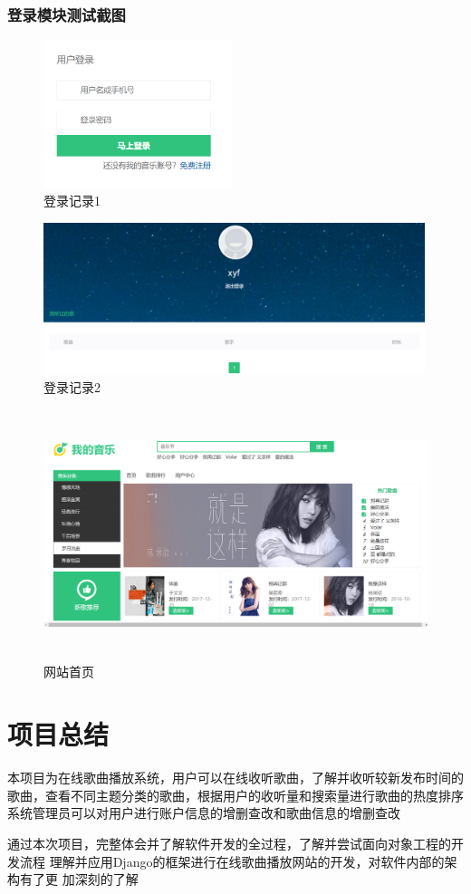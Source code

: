\documentclass[UTF8,14pt]{article}
\numberwithin{figure}{subsubsection}
\numberwithin{table}{subsubsection}
\begin{document}
\subsubsection{登录模块测试截图}
\begin{minipage}[t]{0.33\linewidth}
	\begin{figure}[H]
		\includegraphics[width=5.51cm,height=4.33cm]{login1.png}
		\caption{登录记录1}
	\end{figure}
\end{minipage}
\hfill
\begin{minipage}[t]{0.66\linewidth}
	\begin{figure}[H]
		\centering
		\includegraphics[width=11.142cm,height=4.428cm]{login2.png}
		\caption{登录记录2}
	\end{figure}
\end{minipage}
\begin{figure}[H]
	\centering
	\includegraphics[width=15.096cm,height=7.31cm]{final.png}
	\caption{网站首页}
\end{figure}
\section{项目总结}
本项目为在线歌曲播放系统，用户可以在线收听歌曲，了解并收听较新发布时间的
歌曲，查看不同主题分类的歌曲，根据用户的收听量和搜索量进行歌曲的热度排序
系统管理员可以对用户进行账户信息的增删查改和歌曲信息的增删查改

通过本次项目，完整体会并了解软件开发的全过程，了解并尝试面向对象工程的开发流程
理解并应用Django的框架进行在线歌曲播放网站的开发，对软件内部的架构有了更
加深刻的了解
\end{document}
